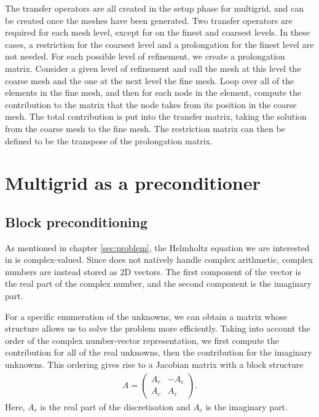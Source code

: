 The transfer operators are all created in the setup phase for multigrid, and can be created once the meshes have been generated.
Two transfer operators are required for each mesh level, except for on the finest and coarsest levels.
In these cases, a restriction for the coarsest level and a prolongation for the finest level are not needed.
For each possible level of refinement, we create a prolongation matrix.
Consider a given level of refinement and call the mesh at this level the coarse mesh and the one at the next level the fine mesh.
Loop over all of the elements in the fine mesh, and then for each node in the element, compute the contribution to the matrix that the node takes from its position in the coarse mesh.
The total contribution is put into the transfer matrix, taking the solution from the coarse mesh to the fine mesh.
The restriction matrix can then be defined to be the transpose of the prolongation matrix.






\section{Multigrid as a preconditioner}
\label{sec:precond}

\subsection{Block preconditioning}


As mentioned in chapter \ref{sec:problem}, the Helmholtz equation we are interested in is complex-valued.
Since \oomph does not natively handle complex arithmetic, complex numbers are instead stored as 2D vectors.
The first component of the vector is the real part of the complex number, and the second component is the imaginary part.

For a specific enumeration of the unknowns, we can obtain a matrix whose structure allows us to solve the problem more efficiently.
Taking into account the order of the \oomph complex number-vector representation, we first compute the contribution for all of the real unknowns, then the contribution for the imaginary unknowns.
This ordering gives rise to a Jacobian matrix with a block structure
\begin{align}
	A = \begin{pmatrix}
		A_r & -A_c \\ A_c & A_r
	\end{pmatrix}.
\end{align}
Here, $A_r$ is the real part of the discretisation and $A_c$ is the imaginary part.

